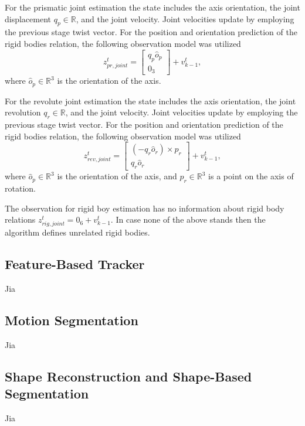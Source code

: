 \documentclass[letterpaper, 10 pt, conference]{ieeeconf}
\begin{document}
For the prismatic joint estimation the state includes the axis orientation, the joint displacement $q_p \in \mathbb{R}$, and the joint velocity. Joint velocities update by employing the previous stage twist vector. For the position and orientation prediction of the rigid bodies relation, the following observation model was utilized
\begin{equation}
z_{pr, joint}^t=\begin{bmatrix}
q_p \hat{o}_p\\
0_3 
\end{bmatrix} + v_{k-1}^t,
\end{equation}
where $\hat{o}_p \in \mathbb{R}^3$ is the orientation of the axis.

For the revolute joint estimation the state includes the axis orientation, the joint revolution $q_r \in \mathbb{R}$, and the joint velocity. Joint velocities update by employing the previous stage twist vector. For the position and orientation prediction of the rigid bodies relation, the following observation model was utilized
\begin{equation}
z_{rev, joint}^t=\begin{bmatrix}
(-q_r \hat{o}_r) \times p_r\\
q_r \hat{o}_r
\end{bmatrix} + v_{k-1}^t,
\end{equation}
where $\hat{o}_p \in \mathbb{R}^3$ is the orientation of the axis, and $p_r \in \mathbb{R}^3$ is a point on the axis of rotation.

The observation for rigid boy estimation has no information about rigid body relations $z_{rig, joint}^t = 0_6 + v_{k-1}^t$. In case none of the above stands then the algorithm defines unrelated rigid bodies.

\subsection{Feature-Based Tracker}\label{FBT}
Jia

\subsection{Motion Segmentation}\label{MS}
Jia

\subsection{Shape Reconstruction and Shape-Based Segmentation}\label{SR_SBS}
Jia
\end{document}
